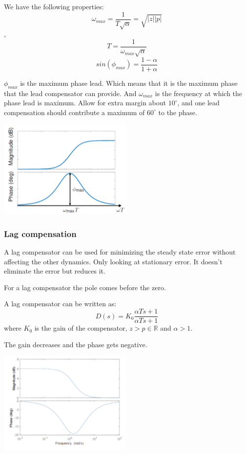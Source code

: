 We have the following properties:
$$\omega_{max} = \frac{1}{T\sqrt{\alpha}} = \sqrt{|z||p|}$$,
$$T = \frac{1}{\omega_{max}\sqrt{\alpha}}$$
$$sin(\phi_{max}) = \frac{1-\alpha}{1+\alpha}$$

$\phi_{max}$ is the maximum phase lead. Which means that it is the
maximum phase that the lead compensator can provide.
And $\omega_{max}$ is the frequency at which the phase lead is maximum.
Allow for extra margin about $10^\circ$, and one lead compensation should contribute a maximum of $60^\circ$ to the phase.


\begin{center}
	\includegraphics[width=0.5\textwidth]{Images/leadComp.png}
\end{center}

\subsubsection{Lag compensation}
A lag compensator can be used for minimizing the steady state error without affecting
the other dynamics. Only looking at stationary error. It doesn't eliminate the error
but reduces it.

For a lag compensator the pole comes before the zero.


A lag compensator can be written as:
$$D(s) = K_0 \frac{\alpha Ts+1}{\alpha Ts+1}$$
where $K_0$ is the gain of the compensator, $z>p \in \mathbb{R}$ and $\alpha > 1$.

The gain decreases and the phase gets negative.


\begin{center}
	\includegraphics[width=0.5\textwidth]{Images/lagComp.png}
\end{center}

